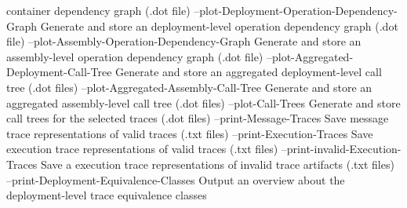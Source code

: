                                                         container dependency
                                                        graph (.dot file)
    --plot-Deployment-Operation-Dependency-Graph        Generate and store an
                                                        deployment-level
                                                        operation dependency
                                                        graph (.dot file)
    --plot-Assembly-Operation-Dependency-Graph          Generate and store an
                                                        assembly-level operation
                                                        dependency graph (.dot
                                                        file)
    --plot-Aggregated-Deployment-Call-Tree              Generate and store an
                                                        aggregated
                                                        deployment-level call
                                                        tree (.dot files)
    --plot-Aggregated-Assembly-Call-Tree                Generate and store an
                                                        aggregated
                                                        assembly-level call tree
                                                        (.dot files)
    --plot-Call-Trees                                   Generate and store call
                                                        trees for the selected
                                                        traces (.dot files)
    --print-Message-Traces                              Save message trace
                                                        representations of valid
                                                        traces (.txt files)
    --print-Execution-Traces                            Save execution trace
                                                        representations of valid
                                                        traces (.txt files)
    --print-invalid-Execution-Traces                    Save a execution trace
                                                        representations of
                                                        invalid trace artifacts
                                                        (.txt files)
    --print-Deployment-Equivalence-Classes              Output an overview about
                                                        the deployment-level
                                                        trace equivalence
                                                        classes
